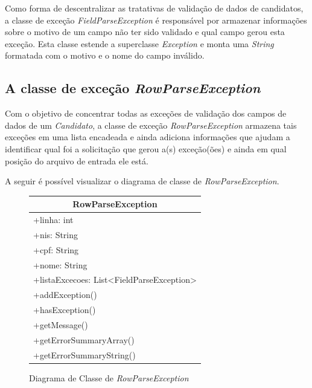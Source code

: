 \documentclass[
	12pt,			%
	openright,		%
	oneside,	
	a4paper,		%
	english,		%
	brazil			%
]{abntex2/abntex2}  %
\begin{document}
				Como forma de descentralizar as tratativas de validação de dados de candidatos, a classe de exceção \textit{FieldParseException} é responsável por armazenar informações sobre o motivo de um campo não ter sido validado e qual campo gerou esta exceção. Esta classe estende a superclasse \textit{Exception} e monta uma \textit{String} formatada com o motivo e o nome do campo inválido.

			\subsection{A classe de exceção \textit{RowParseException}}	

				Com o objetivo de concentrar todas as exceções de validação dos campos de dados de um \textit{Candidato}, a classe de exceção \textit{RowParseException} armazena tais exceções em uma lista encadeada e ainda adiciona informações que ajudam a identificar qual foi a solicitação que gerou a(s) exceção(ões) e ainda em qual posição do arquivo de entrada ele está.
	
				A seguir é possível visualizar o diagrama de classe de \textit{RowParseException}.
	
				\begin{figure}[ht]
					\begin{center}
						
						\caption{Diagrama de Classe de \textit{RowParseException}}
			
						\begin{tabular}{|l|}
							\hline
							\multicolumn{1}{|c|}{\textbf{RowParseException}} \\ \hline
							+linha: int \\
							+nis: String \\
							+cpf: String \\
							+nome: String \\
							+listaExcecoes: List\textless{}FieldParseException\textgreater{} \\ \hline
							+addException() \\
							+hasException() \\
							+getMessage() \\
							+getErrorSummaryArray() \\
							+getErrorSummaryString() \\ \hline
						\end{tabular}
						
					\end{center}
				\end{figure}
\end{document}
